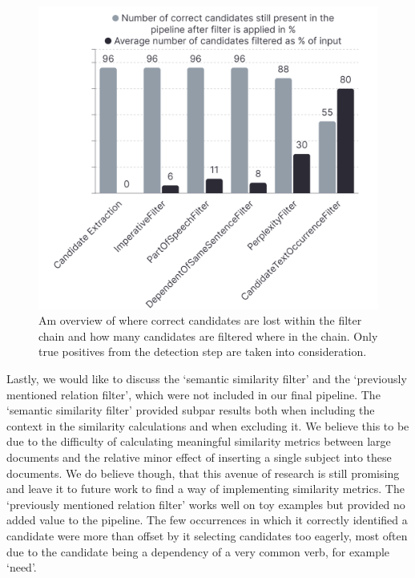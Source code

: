 \documentclass[times, 10pt,twocolumn]{article}
\begin{document}
\begin{figure}
   \centering
   \includegraphics[width=\columnwidth]{filter-performance-1.png}
   \caption{Am overview of where correct candidates are lost within the filter chain and how many
   candidates are filtered where in the chain. Only true positives from the detection step
   are taken into consideration.}
   \label{fig:performance-1}
\end{figure}


Lastly, we would like to discuss the `semantic similarity filter' and the `previously mentioned relation filter',
which were not included in
our final pipeline. The `semantic similarity filter' provided subpar results both when including the context in
the similarity calculations and when excluding it. We believe this to be due to the difficulty of
calculating meaningful similarity metrics between large documents and the relative minor effect of
inserting a single subject into these documents. We do believe though, that
this avenue of research is still promising and leave it to future work to find a way of implementing
similarity metrics.
The `previously mentioned relation filter' works well on toy examples but provided no 
added value to the pipeline. The few occurrences in which it correctly identified a candidate were
more than offset by it selecting candidates too eagerly, most often due to the candidate being a dependency
of a very common verb, for example `need'. 
\end{document}
